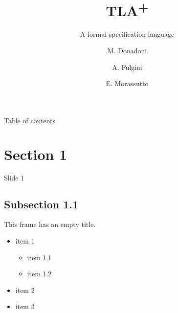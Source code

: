 \documentclass{beamer}
\title{TLA\texorpdfstring{\textsuperscript{+}}{+}}
\subtitle{A formal specification language}
\author{M. Donadoni \and A. Fulgini \and E. Morassutto}
\begin{document}
    \begin{frame}
        \maketitle
    \end{frame}
    
    \begin{frame}{Table of contents}
      \tableofcontents
    \end{frame}
    
    \section[image=bgphoto_cut]{Section 1}
    \begin{frame}[plain]{}
        \sectionpage
    \end{frame}
    
    \begin{frame}{Slide 1}
        \lipsum[1]
    \end{frame}
    
    \subsection{Subsection 1.1}
    \begin{frame}[plain]{}
        \subsectionpage
    \end{frame}
    \begin{frame}
        This frame has an empty title.
        \vfill
        \begin{itemize}
            \item item 1
            \begin{itemize}
                \item item 1.1
                \item item 1.2
            \end{itemize}
            \item item 2
            \item item 3
        \end{itemize}
    \end{frame}
    
\end{document}
